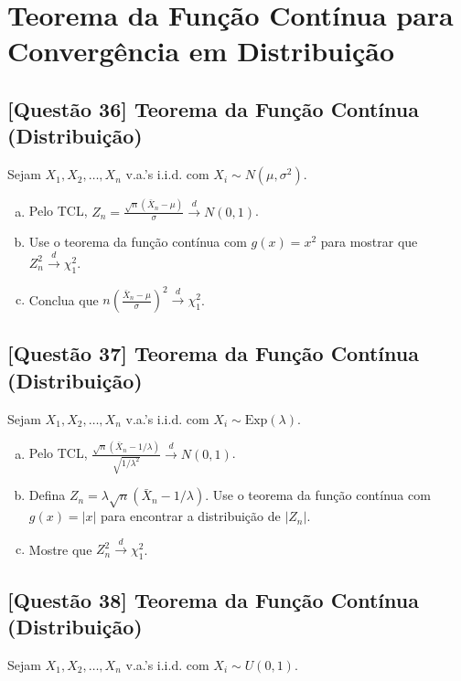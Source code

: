 \documentclass[12pt,a4paper]{article}
\begin{document}
\section{Teorema da Função Contínua para Convergência em Distribuição}

\subsection*{[Questão 36] Teorema da Função Contínua (Distribuição)}

Sejam $X_1, X_2, \ldots, X_n$ v.a.'s i.i.d. com $X_i \sim N(\mu, \sigma^2)$.

\begin{enumerate}[(a)]
    \item Pelo TCL, $Z_n = \frac{\sqrt{n}(\bar{X}_n - \mu)}{\sigma} \xrightarrow{d} N(0,1)$.
    \item Use o teorema da função contínua com $g(x) = x^2$ para mostrar que $Z_n^2 \xrightarrow{d} \chi^2_1$.
    \item Conclua que $n\left(\frac{\bar{X}_n - \mu}{\sigma}\right)^2 \xrightarrow{d} \chi^2_1$.
\end{enumerate}

\subsection*{[Questão 37] Teorema da Função Contínua (Distribuição)}

Sejam $X_1, X_2, \ldots, X_n$ v.a.'s i.i.d. com $X_i \sim \text{Exp}(\lambda)$.

\begin{enumerate}[(a)]
    \item Pelo TCL, $\frac{\sqrt{n}(\bar{X}_n - 1/\lambda)}{\sqrt{1/\lambda^2}} \xrightarrow{d} N(0,1)$.
    \item Defina $Z_n = \lambda\sqrt{n}(\bar{X}_n - 1/\lambda)$. Use o teorema da função contínua com $g(x) = |x|$ para encontrar a distribuição de $|Z_n|$.
    \item Mostre que $Z_n^2 \xrightarrow{d} \chi^2_1$.
\end{enumerate}

\subsection*{[Questão 38] Teorema da Função Contínua (Distribuição)}

Sejam $X_1, X_2, \ldots, X_n$ v.a.'s i.i.d. com $X_i \sim U(0,1)$.
\end{document}
